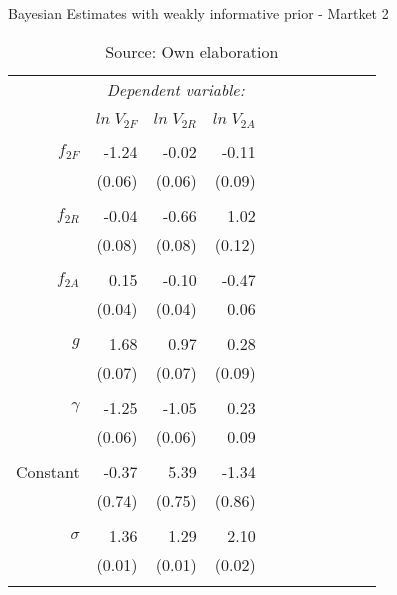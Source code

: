 \begin{table}[ht]
\caption{Bayesian Estimates with weakly informative prior - Martket 2}
\centering
\begin{tabular}{rrrrrrrrrrr}
  \toprule 
 & \multicolumn{3}{c}{\textit{Dependent variable:}} \\ 
\cline{2-4} 
\\[-1.8ex] & $ln \; V_{2F}$ & $ln \; V_{2R}$ & $ln \; V_{2A}$ \\ 
\hline \\[-1.8ex] 

  $f_{2F}$ & -1.24  & -0.02 & -0.11\\
  		     & (0.06)  & (0.06) & (0.09)\\
& & \\
  $f_{2R}$ & -0.04 & -0.66 & 1.02\\
  			   & (0.08) &  (0.08) & (0.12)\\
& & \\  
$f_{2A}$ & 0.15 & -0.10 & -0.47\\
           & (0.04) & (0.04) & 0.06 \\
& & \\  
  $g$ & 1.68 & 0.97 & 0.28\\
  		& (0.07) & (0.07) & (0.09)\\
& & \\
  $\gamma$ & -1.25  & -1.05 & 0.23\\
  			& (0.06) & (0.06) & 0.09\\
& & \\  
  Constant &-0.37  & 5.39 & -1.34 \\
  			& (0.74) & (0.75) & (0.86)\\
& & \\  
  \hline
  $\sigma$ & 1.36  & 1.29 & 2.10 \\
  		 & (0.01) & (0.01) & (0.02)\\
& & \\
\bottomrule
\end{tabular}
\caption*{Source: Own elaboration}
\end{table}
